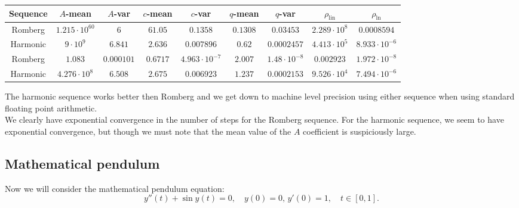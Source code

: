 \begin{table}[H]
    \centering
    \small
    \begin{tabular}{c||c|c|c|c|c|c|c|c}
Sequence & \(A\)-mean & \(A\)-var & \(c\)-mean & \(c\)-var & \(q\)-mean & \(q\)-var & \(\rho_{\operatorname{lin}}\) & \(\rho_{\ln}\)\\\hline
\rowcolor{red}
Romberg & \(1.215\cdot 10^{60}\) & \(6\) & \(61.05\) & \(0.1358\) & \(0.1308\) & \(0.03453\) & \(2.289\cdot 10^8\) & \(0.0008594\) \\
\rowcolor{yellow}
Harmonic & \(9\cdot 10^9\) & \(6.841\) & \(2.636\) & \(0.007896\) & \(0.62\) & \(0.0002457\) & \(4.413\cdot 10^5\) & \(8.933\cdot 10^{-6}\) \\
\rowcolor{green}
Romberg & \(1.083\) & \(0.000101\) & \(0.6717\) & \(4.963\cdot 10^{-7}\) & \(2.007\) & \(1.48\cdot 10^{-8}\) & \(0.002923\) & \(1.972\cdot 10^{-8}\) \\
\rowcolor{yellow}
Harmonic & \(4.276\cdot 10^8\) & \(6.508\) & \(2.675\) & \(0.006923\) & \(1.237\) & \(0.0002153\) & \(9.526\cdot 10^4\) & \(7.494\cdot 10^{-6}\) \\
    \end{tabular}
    \label{tab:my_label}
\end{table}

The harmonic sequence works better then Romberg and we get down to machine level precision using either sequence when using standard floating point arithmetic.\\

We clearly have exponential convergence in the number of steps for the Romberg sequence. For the harmonic sequence, we seem to have exponential convergence, but though we must note that the mean value of the \(A\) coefficient is suspiciously large.

\subsection{Mathematical pendulum}

Now we will consider the mathematical pendulum equation:
\begin{equation}
y''(t) + \sin y(t) = 0,\quad y(0) = 0,\, y'(0) = 1, \quad t\in [0,1].
\end{equation}

